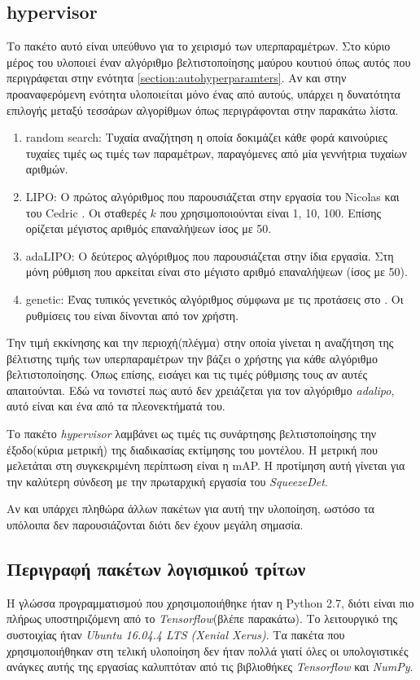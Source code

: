 \subsection{hypervisor}
Το πακέτο αυτό είναι υπεύθυνο για το χειρισμό των υπερπαραμέτρων. Στο κύριο μέρος του υλοποιεί έναν αλγόριθμο βελτιστοποίησης μαύρου κουτιού όπως αυτός που περιγράφεται στην ενότητα \ref{section:autohyperparamters}. Αν και στην προαναφερόμενη ενότητα υλοποιείται μόνο ένας από αυτούς, υπάρχει η δυνατότητα επιλογής μεταξύ τεσσάρων αλγορίθμων όπως περιγράφονται στην παρακάτω λίστα.
\begin{enumerate}
    \item random search: Τυχαία αναζήτηση η οποία δοκιμάζει κάθε φορά καινούριες τυχαίες τιμές ως τιμές των παραμέτρων, παραγόμενες από μία γεννήτρια τυχαίων αριθμών.
    \item LIPO: Ο πρώτος αλγόριθμος που παρουσιάζεται στην εργασία του Nicolas και του Cedric \cite{64}. Οι σταθερές $k$ που χρησιμοποιούνται είναι 1, 10, 100. Επίσης ορίζεται μέγιστος αριθμός επαναλήψεων ίσος με 50.
    \item adaLIPO: Ο δεύτερος αλγόριθμος που παρουσιάζεται στην ίδια εργασία. Στη μόνη ρύθμιση που αρκείται είναι στο μέγιστο αριθμό επαναλήψεων (ίσος με 50).
    \item genetic: Ένας τυπικός γενετικός αλγόριθμος σύμφωνα με τις προτάσεις στο \cite{69}. Οι ρυθμίσεις του είναι δίνονται από τον χρήστη.
\end{enumerate}

Την τιμή εκκίνησης και την περιοχή(πλέγμα) στην οποία γίνεται η αναζήτηση της βέλτιστης τιμής των υπερπαραμέτρων την βάζει ο χρήστης για κάθε αλγόριθμο βελτιστοποίησης. Όπως επίσης, εισάγει και τις τιμές ρύθμισης τους αν αυτές απαιτούνται. Εδώ να τονιστεί πως αυτό δεν χρειάζεται για τον αλγόριθμο \textit{adalipo}, αυτό είναι και ένα από τα πλεονεκτήματά του.

Το πακέτο \textit{hypervisor} λαμβάνει ως τιμές τις συνάρτησης βελτιστοποίησης την έξοδο(κύρια μετρική) της διαδικασίας εκτίμησης του μοντέλου. Η μετρική που μελετάται στη συγκεκριμένη περίπτωση είναι η mAP. Η προτίμηση αυτή γίνεται για την καλύτερη σύνδεση με την πρωταρχική εργασία του \textit{SqueezeDet}.

Αν και υπάρχει πληθώρα άλλων πακέτων για αυτή την υλοποίηση, ωστόσο τα υπόλοιπα δεν παρουσιάζονται διότι δεν έχουν μεγάλη σημασία.

\subsection{Περιγραφή πακέτων λογισμικού τρίτων}
Η γλώσσα προγραμματισμού που χρησιμοποιήθηκε ήταν η Python 2.7, διότι είναι πιο πλήρως υποστηριζόμενη από το \textit{Tensorflow}(βλέπε παρακάτω). Το λειτουργικό της συστοιχίας ήταν \textit{Ubuntu 16.04.4 LTS (Xenial Xerus)}. Τα πακέτα που χρησιμοποιήθηκαν στη τελική υλοποίηση δεν ήταν πολλά γιατί όλες οι υπολογιστικές ανάγκες αυτής της εργασίας καλυπτόταν από τις βιβλιοθήκες \textit{Tensorflow} και \textit{NumPy}.

